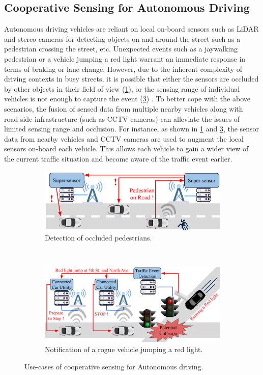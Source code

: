 \subsection{Cooperative Sensing for Autonomous Driving}
Autonomous driving vehicles are reliant on local on-board sensors such as LiDAR and stereo cameras for detecting objects on and around the street such as a pedestrian crossing the street, etc. Unexpected events such as a jaywalking pedestrian or a vehicle jumping a red light warrant an immediate response in terms of braking or lane change. However, due to the inherent complexity of driving contexts in busy streets, it is possible that either the sensors are occluded by other objects in their field of view (\cref{fig:pedestrian}), or the sensing range of individual vehicles is not enough to capture the event (\cref{fig:redlight}) \cite{fusioneye}. To better cope with the above scenarios, the fusion of sensed data from multiple nearby vehicles along with road-side infrastructure (such as CCTV cameras) can alleviate the issues of limited sensing range and occlusion. For instance, as shown in \cref{fig:pedestrian} and \cref{fig:redlight}, the sensor data from nearby vehicles and CCTV cameras are used to augment the local sensors on-board each vehicle. This allows each vehicle to gain a wider view of the current traffic situation and become aware of the traffic event earlier.
\begin{figure}[t!]
    \centering
    \begin{subfigure}[t]{0.45\textwidth}
        \centering
        \includegraphics[width=\textwidth]{figures/apps/pedestrian}
        \caption{Detection of occluded pedestrians.}
        \label{fig:pedestrian}
    \end{subfigure}%
    ~ 
    \begin{subfigure}[t]{0.45\textwidth}
        \centering
        \includegraphics[width=\textwidth]{figures/apps/redlight}
        \caption{Notification of a rogue vehicle jumping a red light.}
        \label{fig:redlight}
    \end{subfigure}
    \caption{Use-cases of cooperative sensing for Autonomous driving.}
\end{figure}

